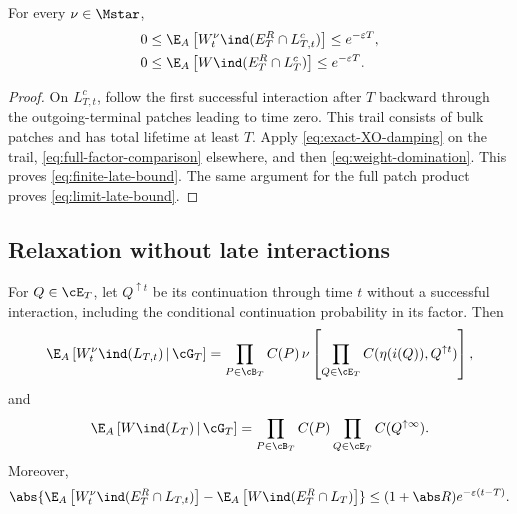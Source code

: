 \begin{lemma}
\label{lem:late-interaction-bounds}
For every \(\nu\in\Mstar\),
\begin{align}
  0
  &\le
  \E_A\left[
    W_t^\nu\ind(E_T^R\cap L_{T,t}^c)
  \right]
  \le
  e^{-\varepsilon T},
  \label{eq:finite-late-bound}
  \\
  0
  &\le
  \E_A\left[
    W\ind(E_T^R\cap L_T^c)
  \right]
  \le
  e^{-\varepsilon T}.
  \label{eq:limit-late-bound}
\end{align}
\end{lemma}

\begin{proof}
On \(L_{T,t}^c\), follow the first successful interaction after \(T\)
backward through the outgoing-terminal patches leading to time zero.
This trail consists of bulk patches and has total lifetime at least
\(T\). Apply \eqref{eq:exact-XO-damping} on the trail,
\eqref{eq:full-factor-comparison} elsewhere, and then
\eqref{eq:weight-domination}. This proves
\eqref{eq:finite-late-bound}. The same argument for the full patch
product proves \eqref{eq:limit-late-bound}.
\end{proof}

\subsection{Relaxation without late interactions}

\begin{lemma}
\label{lem:no-late-relaxation}
For \(Q\in\cE_T\), let \(Q^{\uparrow t}\) be its continuation through
time \(t\) without a successful interaction, including the conditional
continuation probability in its factor. Then
\begin{equation}
  \E_A\left[
    W_t^\nu\ind(L_{T,t})
    \,\middle|\,\cG_T
  \right]
  =
  \prod_{P\in\cB_T}C(P)\,
  \nu\left[
    \prod_{Q\in\cE_T}
    C(\eta(i(Q)),Q^{\uparrow t})
  \right],
  \label{eq:no-late-finite-identity}
\end{equation}
and
\begin{equation}
  \E_A\left[
    W\ind(L_T)
    \,\middle|\,\cG_T
  \right]
  =
  \prod_{P\in\cB_T}C(P)
  \prod_{Q\in\cE_T}C(Q^{\uparrow\infty}).
  \label{eq:no-late-limit-identity}
\end{equation}
Moreover,
\begin{equation}
  \abs{
    \E_A\left[
      W_t^\nu\ind(E_T^R\cap L_{T,t})
    \right]
    -
    \E_A\left[
      W\ind(E_T^R\cap L_T)
    \right]
  }
  \le
  (1+\abs R)e^{-\varepsilon(t-T)}.
  \label{eq:no-late-bound}
\end{equation}
\end{lemma}

